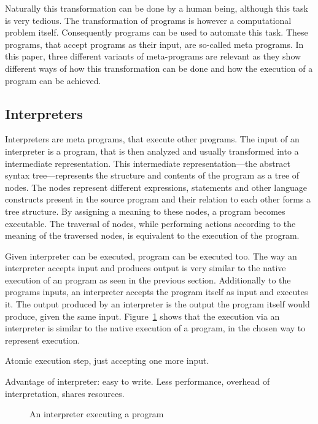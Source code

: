 Naturally this transformation can be done by a human being, although this task is very tedious.
The transformation of programs is however a computational problem itself.
Consequently programs can be used to automate this task.
These programs, that accept programs as their input, are so-called meta programs.
In this paper, three different variants of meta-programs are relevant as they show different ways of how this transformation can be done and how the execution of a program can be achieved. %


\subsection{Interpreters}

Interpreters are meta programs, that execute other programs.
The input of an interpreter is a program, that is then analyzed and usually transformed into a intermediate representation.
This intermediate representation---the abstract syntax tree---represents the structure and contents of the program as a tree of nodes.
The nodes represent different expressions, statements and other language constructs present in the source program and their relation to each other forms a tree structure.
By assigning a meaning to these nodes, a program becomes executable.
The traversal of nodes, while performing actions according to the meaning of the traversed nodes, is equivalent to the execution of the program.

Given interpreter can be executed, program can be executed too.
The way an interpreter accepts input and produces output is very similar to the native execution of an program as seen in the previous section. %
Additionally to the programs inputs, an interpreter accepts the program itself as input and executes it.
The output produced by an interpreter is the output the program itself would produce, given the same input.
Figure~\ref{fig:interpreted-program} shows that the execution via an interpreter is similar to the native execution of a program, in the chosen way to represent execution.

Atomic execution step, just accepting one more input.


Advantage of interpreter: easy to write.
Less performance, overhead of interpretation, shares resources.

\begin{figure}
  \centering
  
  \caption{An interpreter executing a program}\label{fig:interpreted-program}
\end{figure}


